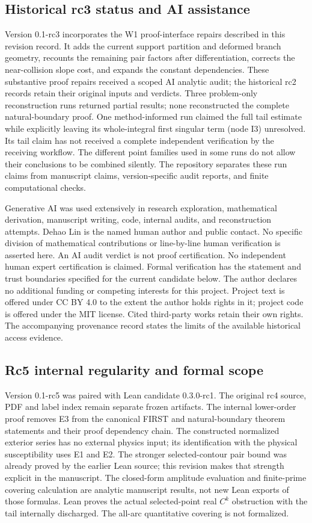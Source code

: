 \documentclass[11pt]{article}
\numberwithin{equation}{section}
\theoremstyle{definition}
\begin{document}
\subsection*{Historical rc3 status and AI assistance}
Version 0.1-rc3 incorporates the W1 proof-interface repairs described in this revision record.
It adds the current support partition and deformed branch geometry,
recounts the remaining pair factors after differentiation, corrects
the near-collision slope cost, and expands the constant dependencies.
These substantive proof repairs received a scoped AI analytic audit;
the historical rc2 records retain their original inputs and verdicts.
Three problem-only reconstruction runs returned partial results;
none reconstructed the complete natural-boundary proof. One
method-informed run claimed the full tail estimate while explicitly
leaving its whole-integral first singular term (node I3) unresolved.
Its tail claim has not received a complete independent verification
by the receiving workflow. The different point families used in
some runs do not allow their conclusions to be combined silently.
The repository separates these run claims from manuscript claims,
version-specific audit reports, and finite computational checks.

Generative AI was used extensively in research exploration,
mathematical derivation, manuscript writing, code, internal audits,
and reconstruction attempts. Dehao Lin is the named human author
and public contact. No specific division of mathematical contributions
or line-by-line human verification is asserted here.
An AI audit verdict is not proof certification. No independent human
expert certification is claimed. Formal verification has the statement
and trust boundaries specified for the current candidate below.
The author declares no additional funding or competing interests
for this project. Project text is offered under CC BY 4.0 to the extent
the author holds rights in it; project code is offered under the MIT
license. Cited third-party works retain their own rights.
The accompanying provenance record states
the limits of the available historical access evidence.

\subsection*{Rc5 internal regularity and formal scope}
Version 0.1-rc5 was paired with Lean candidate 0.3.0-rc1.
The original rc4 source, PDF and label index remain separate frozen
artifacts. The internal lower-order proof removes E3 from the canonical
FIRST and natural-boundary theorem statements and their proof dependency
chain. The constructed normalized exterior series has no external physics
input; its identification with the physical susceptibility uses E1 and E2.
The stronger selected-contour pair bound was already proved by the earlier
Lean source; this revision makes that strength explicit in the manuscript.
The closed-form amplitude evaluation and finite-prime covering calculation
are analytic manuscript results, not new Lean exports of those formulas.
Lean proves the actual selected-point real \(C^k\) obstruction with the tail
internally discharged. The all-arc quantitative covering is not formalized.
\end{document}
